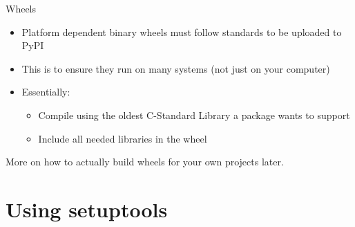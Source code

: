 \begin{frame}[c]{Wheels}
  \begin{itemize}
    \item Platform dependent binary wheels must follow standards to be uploaded to PyPI
    \item This is to ensure they run on many systems (not just on your computer)
    \item Essentially:
      \begin{itemize}
        \item Compile using the oldest C-Standard Library a package wants to support
        \item Include all needed libraries in the wheel
      \end{itemize}
  \end{itemize}

  \bigskip
  \begin{center}
    \Large More on how to actually build wheels for your own projects later.
  \end{center}
\end{frame}



\section{Using setuptools}

